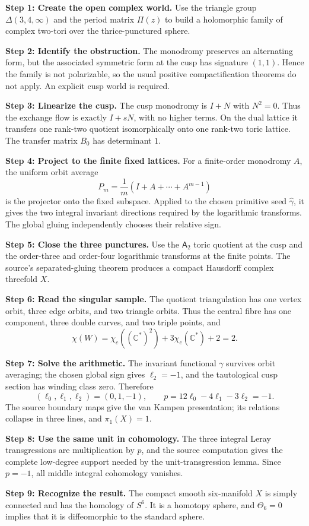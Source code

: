 \documentclass[11pt,reqno]{amsart}
\numberwithin{equation}{section}
\newcommand{\C}{\mathbb C}
\newcommand{\wideg}{\widehat\gamma}
\newcommand{\chic}{\chi_c}
\newcommand{\Aroot}{\mathsf{A}_2}
\theoremstyle{definition}
\newenvironment{proofbox}{%
  \begin{center}\begin{minipage}{0.94\textwidth}\setlength{\parindent}{0pt}\small%
}{%
  \end{minipage}\end{center}%
}
\begin{document}
\begin{proofbox}
\textbf{Step 1: Create the open complex world.}
Use the triangle group $\Delta(3,4,\infty)$ and the period matrix $\Pi(z)$ to build a holomorphic family of complex two-tori over the thrice-punctured sphere.

\medskip
\textbf{Step 2: Identify the obstruction.}
The monodromy preserves an alternating form, but the associated symmetric form at the cusp has signature $(1,1)$. Hence the family is not polarizable, so the usual positive compactification theorems do not apply. An explicit cusp world is required.

\medskip
\textbf{Step 3: Linearize the cusp.}
The cusp monodromy is $I+N$ with $N^2=0$. Thus the exchange flow is exactly $I+sN$, with no higher terms. On the dual lattice it transfers one rank-two quotient isomorphically onto one rank-two toric lattice. The transfer matrix $B_0$ has determinant $1$.

\medskip
\textbf{Step 4: Project to the finite fixed lattices.}
For a finite-order monodromy $A$, the uniform orbit average
\[
P_m=\frac1m(I+A+\cdots+A^{m-1})
\]
is the projector onto the fixed subspace. Applied to the chosen primitive seed $\wideg$, it gives the two integral invariant directions required by the logarithmic transforms. The global gluing independently chooses their relative sign.

\medskip
\textbf{Step 5: Close the three punctures.}
Use the $\Aroot$ toric quotient at the cusp and the order-three and order-four logarithmic transforms at the finite points. The source's separated-gluing theorem produces a compact Hausdorff complex threefold $X$.

\medskip
\textbf{Step 6: Read the singular sample.}
The quotient triangulation has one vertex orbit, three edge orbits, and two triangle orbits. Thus the central fibre has one component, three double curves, and two triple points, and
\[
\chi(W)=\chic((\C^*)^2)+3\chic(\C^*)+2=2.
\]

\medskip
\textbf{Step 7: Solve the arithmetic.}
The invariant functional $\gamma$ survives orbit averaging; the chosen global sign gives $\ell_2=-1$, and the tautological cusp section has winding class zero. Therefore
\[
(\ell_0,\ell_1,\ell_2)=(0,1,-1),
\qquad p=12\ell_0-4\ell_1-3\ell_2=-1.
\]
The source boundary maps give the van Kampen presentation; its relations collapse in three lines, and $\pi_1(X)=1$.

\medskip
\textbf{Step 8: Use the same unit in cohomology.}
The three integral Leray transgressions are multiplication by $p$, and the source computation gives the complete low-degree support needed by the unit-transgression lemma. Since $p=-1$, all middle integral cohomology vanishes.

\medskip
\textbf{Step 9: Recognize the result.}
The compact smooth six-manifold $X$ is simply connected and has the homology of $S^6$. It is a homotopy sphere, and $\Theta_6=0$ implies that it is diffeomorphic to the standard sphere.
\end{proofbox}
\end{document}
